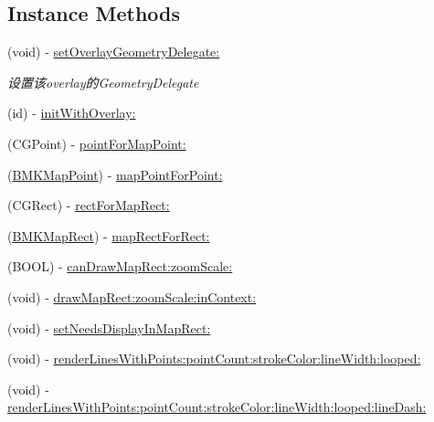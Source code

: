 \subsection*{Instance Methods}
\begin{DoxyCompactItemize}
\item 
\hypertarget{interface_b_m_k_overlay_view_a3de48574cf1f778c733407824b5aad6f}{}(void) -\/ \hyperlink{interface_b_m_k_overlay_view_a3de48574cf1f778c733407824b5aad6f}{set\+Overlay\+Geometry\+Delegate\+:}\label{interface_b_m_k_overlay_view_a3de48574cf1f778c733407824b5aad6f}

\begin{DoxyCompactList}\small\item\em 设置该overlay的\+Geometry\+Delegate \end{DoxyCompactList}\item 
(id) -\/ \hyperlink{interface_b_m_k_overlay_view_a93cdba852e915d6a417b95edabe4af4c}{init\+With\+Overlay\+:}
\item 
(C\+G\+Point) -\/ \hyperlink{interface_b_m_k_overlay_view_a211d0d55b1c10b0abca45e83f4fcf05c}{point\+For\+Map\+Point\+:}
\item 
(\hyperlink{struct_b_m_k_map_point}{B\+M\+K\+Map\+Point}) -\/ \hyperlink{interface_b_m_k_overlay_view_ab0270107a383cf49fd46d9b624604d53}{map\+Point\+For\+Point\+:}
\item 
(C\+G\+Rect) -\/ \hyperlink{interface_b_m_k_overlay_view_a4eb52fd9951bcfc898e9a026ee40e99e}{rect\+For\+Map\+Rect\+:}
\item 
(\hyperlink{struct_b_m_k_map_rect}{B\+M\+K\+Map\+Rect}) -\/ \hyperlink{interface_b_m_k_overlay_view_ae8c0f0415357f281451eaa602b3f388b}{map\+Rect\+For\+Rect\+:}
\item 
(B\+O\+O\+L) -\/ \hyperlink{interface_b_m_k_overlay_view_ad5c0685243ded79bc6657ebb7df08f87}{can\+Draw\+Map\+Rect\+:zoom\+Scale\+:}
\item 
(void) -\/ \hyperlink{interface_b_m_k_overlay_view_aad771b4c325461d99b142e79287188dc}{draw\+Map\+Rect\+:zoom\+Scale\+:in\+Context\+:}
\item 
(void) -\/ \hyperlink{interface_b_m_k_overlay_view_aca005b8bf49d57b404da473fd6f0d534}{set\+Needs\+Display\+In\+Map\+Rect\+:}
\item 
(void) -\/ \hyperlink{interface_b_m_k_overlay_view_a67fcc048446dfa1725aa4a86b241b282}{render\+Lines\+With\+Points\+:point\+Count\+:stroke\+Color\+:line\+Width\+:looped\+:}
\item 
(void) -\/ \hyperlink{interface_b_m_k_overlay_view_a81a56677ce4da3b33a07430793784341}{render\+Lines\+With\+Points\+:point\+Count\+:stroke\+Color\+:line\+Width\+:looped\+:line\+Dash\+:}

\end{DoxyCompactItemize}
